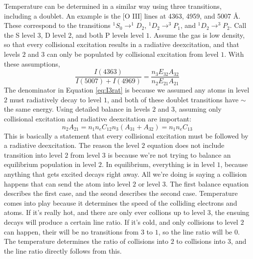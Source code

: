 Temperature can be determined in a similar way using three transitions, including a doublet.  
An example is the [O III] lines at 4363, 4959, and 5007 \AA.  These correspond to the transitions
$^1S_0\rightarrow ^1D_2$, $^1D_2\rightarrow ^3P_1$, and $^1D_2\rightarrow ^3P_2$.  Call the S 
level $3$, D level $2$, and both P levels level $1$.  Assume the gas is low density, so that every 
collisional excitation results in a radiative deexcitation, and that levels $2$ and $3$ can only 
be populated by collisional excitation from level $1$.  With these assumptions, 
\begin{equation}\label{eq:I3rat}
\frac{I(4363)}{I(5007)+I(4969)}=\frac{n_3E_{32}A_{32}}{n_2E_{21}A_{21}}
\end{equation}
The denominator in Equation \ref{eq:I3rat} is because we assumed any atoms in level $2$ must 
radiatively decay to level $1$, and both of these doublet transitions have $\sim$the same energy.  
Using detailed balance in levels $2$ and $3$, assuming only collisional excitation and radiative 
deexcitation are important:
\begin{equation}
n_2A_{21}=n_1n_eC_{12}
n_3(A_{31}+A_{32})=n_1n_eC_{13}
\end{equation}
This is basically a statement that every collisional excitation must be followed by a 
radiative deexcitation.  The reason the level $2$ equation does not include transition into 
level $2$ from level $3$ is because we're not trying to balance an equilibrium population in level 
$2$.  In equilibrium, everything is in level $1$, because anything that gets excited decays right 
away.  All we're doing is saying a collision happens that can send the atom into level $2$ or 
level $3$.  The first balance equation describes the first case, and the seond describes the 
second case.  Temperature comes into play because it determines the speed of the colliding 
electrons and atoms.  If it's really hot, and there are only ever collions up to level $3$, the 
ensuing decays will produce a certain line ratio.  If it's cold, and only collisions to level $2$ 
can happen, their will be no transitions from $3$ to $1$, so the line ratio will be $0$.  The 
temperature determines the ratio of collisions into $2$ to collisions into $3$, and the line 
ratio directly follows from this.  

